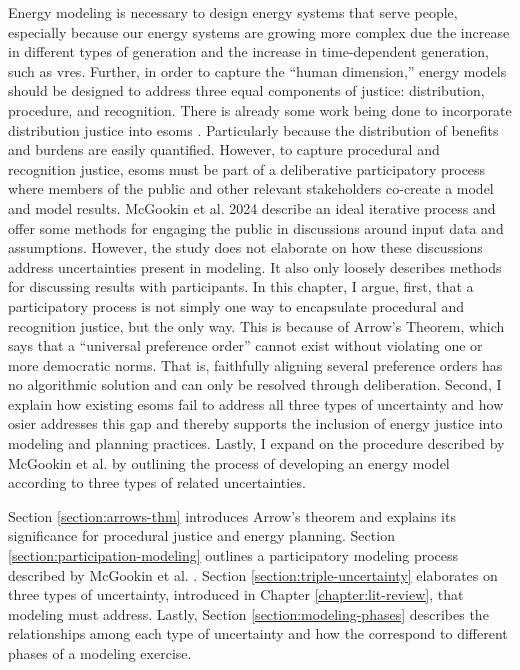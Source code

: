 Energy modeling is necessary to design energy systems that serve people,
especially because our energy systems are growing more complex due the increase
in different types of generation and the increase in time-dependent generation,
such as \acfp{vre}. Further, in order to capture the ``human dimension,'' energy
models should be designed to address three equal components of justice:
distribution, procedure, and recognition. There is already some work being done
to incorporate distribution justice into \acp{esom}
\cite{neumann_near-optimal_2021,jafino_enabling_2021}. Particularly because the
distribution of benefits and burdens are easily quantified. However, to capture
procedural and recognition justice, \acp{esom} must be part of a deliberative
participatory process where members of the public and other relevant
stakeholders co-create a model and model results. McGookin et al. 2024 describe
an ideal iterative process \cite{mcgookin_advancing_2024} and offer some methods
for engaging the public in discussions around input data and assumptions.
However, the study does not elaborate on how these discussions address
uncertainties present in modeling. It also only loosely describes methods for
discussing results with participants. In this chapter, I argue, first, that a
participatory process is not simply one way to encapsulate procedural and
recognition justice, but the only way. This is because of Arrow's Theorem, which
says that a ``universal preference order'' cannot exist without violating one or
more democratic norms. That is, faithfully aligning several preference orders
has no algorithmic solution and can only be resolved through deliberation.
Second, I explain how existing \acp{esom} fail to address all three types of
uncertainty and how \ac{osier} addresses this gap and thereby supports the
inclusion of energy justice into modeling and planning practices. Lastly, I
expand on the procedure described by McGookin et al.
\cite{mcgookin_advancing_2024} by outlining the process of developing an energy
model according to three types of related uncertainties.

Section \ref{section:arrows-thm} introduces Arrow's theorem and explains its
significance for procedural justice and energy planning. Section
\ref{section:participation-modeling} outlines a participatory modeling process
described by McGookin et al. \cite{mcgookin_advancing_2024}. Section
\ref{section:triple-uncertainty} elaborates on three types of uncertainty,
introduced in Chapter \ref{chapter:lit-review}, that modeling must address.
Lastly, Section \ref{section:modeling-phases} describes the relationships among
each type of uncertainty and how the correspond to different phases of a
modeling exercise.


